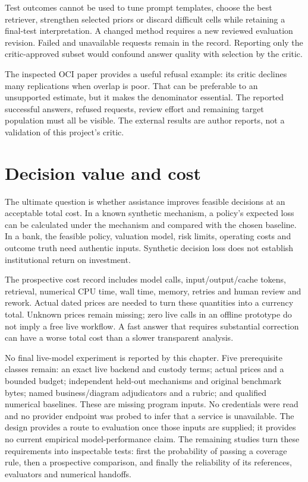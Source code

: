 Test outcomes cannot be used to tune prompt templates, choose the best
retriever, strengthen selected priors or discard difficult cells while
retaining a final-test interpretation. A changed method requires a new
reviewed evaluation revision. Failed and unavailable requests remain in the
record. Reporting only the critic-approved subset would confound answer
quality with selection by the critic.

The inspected OCI paper provides a useful refusal example: its critic
declines many replications when overlap is poor. That can be preferable
to an unsupported estimate, but it makes the denominator essential.
The reported successful answers, refused requests, review effort and
remaining target population must all be visible. The external results
are author reports, not a validation of this project's critic.
\cite{v12_la_2607_22443}

\section{Decision value and cost}

The ultimate question is whether assistance improves feasible decisions at
an acceptable total cost. In a known synthetic mechanism, a policy's expected
loss can be calculated under the mechanism and compared with the chosen
baseline. In a bank, the feasible policy, valuation model, risk limits,
operating costs and outcome truth need authentic inputs. Synthetic decision
loss does not establish institutional return on investment.

The prospective cost record includes model calls, input/output/cache tokens,
retrieval, numerical CPU time, wall time, memory, retries and human review
and rework. Actual dated prices are needed to turn these quantities into a
currency total. Unknown prices remain missing; zero live calls in an offline
prototype do not imply a free live workflow. A fast answer that requires
substantial correction can have a worse total cost than a slower transparent
analysis.

No final live-model experiment is reported by this chapter. Five prerequisite
classes remain: an exact live backend and custody terms; actual prices and
a bounded budget; independent held-out mechanisms and original benchmark
bytes; named business/diagram adjudicators and a rubric; and qualified
numerical baselines. These are missing program inputs. No credentials were
read and no provider endpoint was probed to infer that a service is unavailable.
The design provides a route to evaluation once those inputs are supplied;
it provides no current empirical model-performance claim. The remaining studies turn these requirements into inspectable tests: first the probability of passing a coverage rule, then a prospective comparison, and finally the reliability of its references, evaluators and numerical handoffs.


